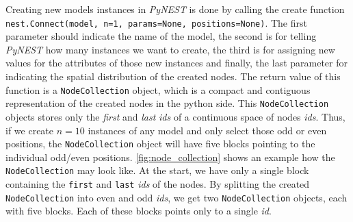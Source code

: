 Creating new models instances in \emph{PyNEST} is done by calling the create function \\\texttt{nest.Connect(model, n=1, params=None, positions=None)}. The first parameter should indicate the name of the model, the second is for telling \emph{PyNEST} how many instances we want to create, the third is for assigning new values for the attributes of those new instances and finally, the last parameter for indicating the spatial distribution of the created nodes. The return value of this function is a \texttt{NodeCollection} object, which is a compact and contiguous representation of the created nodes in the python side. This \texttt{NodeCollection} objects stores only the \emph{first} and \emph{last} \emph{ids} of a continuous space of nodes \emph{ids}. Thus, if we create $n=10$ instances of any model and only select those odd or even positions, the \texttt{NodeCollection} object will have five blocks pointing to the individual odd/even positions. \autoref{fig:node_collection} shows an example how the \texttt{NodeCollection} may look like. At the start, we have only a single block containing the \texttt{first} and \texttt{last} \emph{ids} of the nodes. By splitting the created \texttt{NodeCollection} into even and odd \emph{ids}, we get two \texttt{NodeCollection} objects, each with five blocks. Each of these blocks points only to a single \emph{id}.


